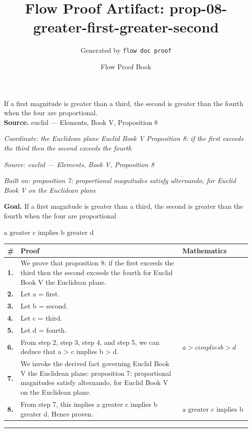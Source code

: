 \documentclass[11pt]{article}
\title{Flow Proof Artifact: prop-08-greater-first-greater-second}
\author{Generated by \texttt{flow doc proof}}
\date{Flow Proof Book}
\theoremstyle{definition}
\begin{document}
\maketitle
If a first magnitude is greater than a third, the second is greater than the fourth when the four are proportional.\\[0.5em]
\textbf{Source.} euclid — Elements, Book V, Proposition 8\\[0.5em]
\bigskip
{}\par
\smallskip\noindent\textit{Coordinate: the Euclidean plane \cdot Euclid Book V \cdot Proposition 8: if the first exceeds the third then the second exceeds the fourth}\par
\smallskip\noindent\textit{Source: euclid — Elements, Book V, Proposition 8}\par
\smallskip\noindent\textit{Built on: proposition 7: proportional magnitudes satisfy alternando, for Euclid Book V on the Euclidean plane}\par
\medskip
\noindent\textbf{Goal.} If a first magnitude is greater than a third, the second is greater than the fourth when the four are proportional\par
\noindent$\displaystyle \text{a greater c implies b greater d}$\par
\medskip
\noindent
\begin{tabular}{@{} >{\raggedright\arraybackslash}p{} >{\raggedright\arraybackslash}p{} >{\raggedleft\arraybackslash}p{} @{}}
\textbf{\#} & \textbf{Proof} & \textbf{Mathematics} \\
\midrule
\textbf{1.} & We prove that proposition 8: if the first exceeds the third then the second exceeds the fourth for Euclid Book V the Euclidean plane. & \\[0.45em]
\textbf{2.} & Let a = first. & \\[0.45em]
\textbf{3.} & Let b = second. & \\[0.45em]
\textbf{4.} & Let c = third. & \\[0.45em]
\textbf{5.} & Let d = fourth. & \\[0.45em]
\textbf{6.} & From step 2, step 3, step 4, and step 5, we can deduce that a > c implies b > d. & $\displaystyle a > c implies b > d$ \\[0.45em]
\textbf{7.} & We invoke the derived fact governing Euclid Book V the Euclidean plane: proposition 7: proportional magnitudes satisfy alternando, for Euclid Book V on the Euclidean plane. & \\[0.45em]
\textbf{8.} & From step 7, this implies a greater c implies b greater d. Hence proven. & $\displaystyle \text{a greater c implies b greater d}$ \\[0.45em]
\bottomrule
\end{tabular}
\label{thm:Geometry-Euclid Book V-proposition_8_if_the_first_exceeds_the_third_then_the_second_exceeds_the_fourth}
\par\medskip\hrule
\end{document}
